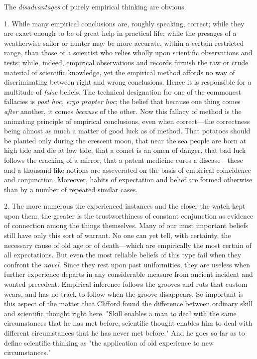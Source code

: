 \documentclass[showtrims,ustradepaper]{memoir}
\begin{document}
The \emph{disadvantages} of purely empirical thinking are
obvious.


1. While many empirical conclusions are, roughly speaking, correct;
while they are exact enough to be of great help in practical life; while
the presages of a weatherwise sailor or hunter may be more accurate,
within a certain restricted range, than those of a scientist who relies
wholly upon scientific observations and tests; while, indeed, empirical
observations and records furnish the raw or crude material of scientific
knowledge, yet the empirical method affords no way of discriminating
between right and wrong conclusions. Hence it is responsible for a
multitude of \emph{false} beliefs. The technical designation for one of
the commonest fallacies is \emph{post hoc, ergo propter hoc}; the belief
that because one thing comes \emph{after} another, it comes
\emph{because} of the other. Now this fallacy of method is the animating
principle of empirical conclusions, even when correct---the correctness
being almost as much a matter of good luck as of method. That potatoes
should be planted only during the crescent moon, that near the sea
people are born at high tide and die at low tide, that a comet is an
omen of danger, that bad luck follows the cracking of a mirror, that a
patent medicine cures a disease---these and a thousand like notions are
asseverated on the basis of empirical coincidence and conjunction.
Moreover, habits of expectation and belief are formed otherwise than by
a number of repeated similar cases.


2. The more numerous the experienced instances and the closer the watch
kept upon them, the greater is the trustworthiness of constant
conjunction as evidence of connection among the things themselves. Many
of our most important beliefs still have only this sort of warrant. No
one can yet tell, with certainty, the
necessary
cause of old age or of death---which are empirically the most certain of
all expectations. But even the most reliable beliefs of this type fail
when they confront the \emph{novel}. Since they rest upon past
uniformities, they are useless when further experience departs in any
considerable measure from ancient incident and wonted precedent.
Empirical inference follows the grooves and ruts that custom wears, and
has no track to follow when the groove disappears. So important is this
aspect of the matter that Clifford found the difference between ordinary
skill and scientific thought right here. "Skill enables a man to deal
with the same circumstances that he has met before, scientific thought
enables him to deal with different circumstances that he has never met
before." And he goes so far as to define scientific thinking as "the
application of old experience to new circumstances."
\end{document}

